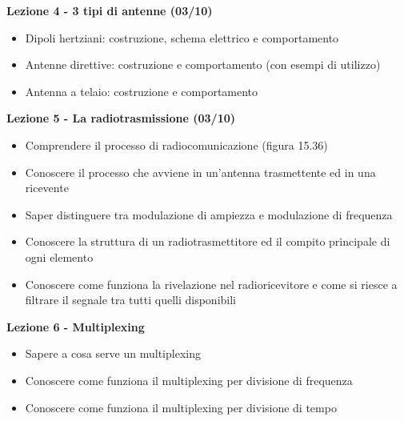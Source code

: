 \documentclass{article}
\begin{document}
	\begin{center}
		\textbf{Lezione 4 - 3 tipi di antenne (03/10)}
		\begin{itemize}
			\item Dipoli hertziani: costruzione, schema elettrico e comportamento
			\item Antenne direttive: costruzione e comportamento (con esempi di utilizzo)
			\item Antenna a telaio: costruzione e comportamento
		\end{itemize}
	\end{center}

	\begin{center}
		\textbf{Lezione 5 - La radiotrasmissione (03/10)}
		\begin{itemize}
			\item Comprendere il processo di radiocomunicazione (figura 15.36)
			\item Conoscere il processo che avviene in un'antenna trasmettente ed in una ricevente
			\item Saper distinguere tra modulazione di ampiezza e modulazione di frequenza
			\item Conoscere la struttura di un radiotrasmettitore ed il compito principale di ogni elemento
			\item Conoscere come funziona la rivelazione nel radioricevitore e come si riesce a filtrare il segnale tra tutti quelli disponibili
		\end{itemize}
	\end{center}

	\begin{center}
		\textbf{Lezione 6 - Multiplexing}
		\begin{itemize}
			\item Sapere a cosa serve un multiplexing
			\item Conoscere come funziona il multiplexing per divisione di frequenza
			\item Conoscere come funziona il multiplexing per divisione di tempo
		\end{itemize}
	\end{center}
\end{document}
